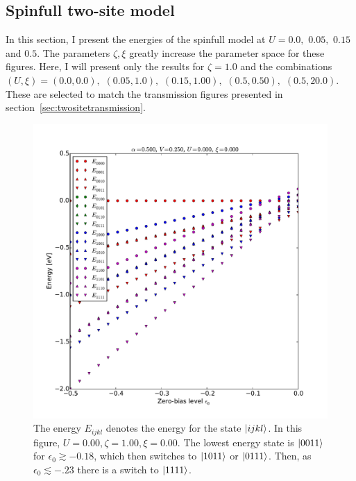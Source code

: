 \subsection{Spinfull two-site model} 
In this section, I present the energies of the spinfull model at $U=0.0, $ $0.05, $ $0.15$ and $0.5$. The parameters $\zeta,\xi$ greatly increase the parameter space for these figures. Here, I will present only the results for $\zeta=1.0$ and the combinations $(U, \xi) = (0.0, 0.0),$ $ (0.05, 1.0), $ $(0.15, 1.00), $ $(0.5, 0.50), $ $(0.5, 20.0)$. These are selected to match the transmission figures presented in section~\ref{sec:twositetransmission}.

\begin{figure}[h]
    \centering
    \includegraphics[height=.45\textheight]{pdf/energy/pespin_distribution_u0_k0.pdf}
    \caption{The energy $E_{ijkl}$ denotes the energy for the state $\ket{ijkl}$. In this figure, $U=0.00, \zeta=1.00, \xi=0.00$. The lowest energy state is $\ket{0011}$ for $\epsilon_0\gtrsim -0.18$, which then switches to $\ket{1011}$ or $\ket{0111}$. Then, as $\epsilon_0 \lesssim -.23$ there is a switch to $\ket{1111}$.}
    \label{fig:perspinenergy00}
\end{figure} 
